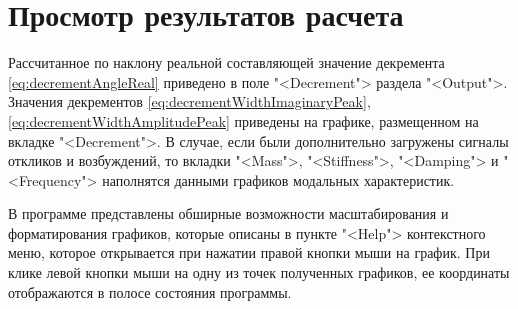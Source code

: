 \section{Просмотр результатов расчета}

Рассчитанное по наклону реальной составляющей значение декремента \eqref{eq:decrementAngleReal} приведено в поле "<Decrement"> раздела "<Output">. Значения декрементов \eqref{eq:decrementWidthImaginaryPeak}, \eqref{eq:decrementWidthAmplitudePeak} приведены на графике, размещенном на вкладке "<Decrement">. В случае, если были дополнительно загружены сигналы откликов и возбуждений, то вкладки "<Mass">, "<Stiffness">, "<Damping"> и "<Frequency"> наполнятся данными графиков модальных характеристик.

В программе представлены обширные возможности масштабирования и форматирования графиков, которые описаны в пункте "<Help"> контекстного меню, которое открывается при нажатии правой кнопки мыши на график. При клике левой кнопки мыши на одну из точек полученных графиков, ее координаты отображаются в полосе состояния программы.

%
